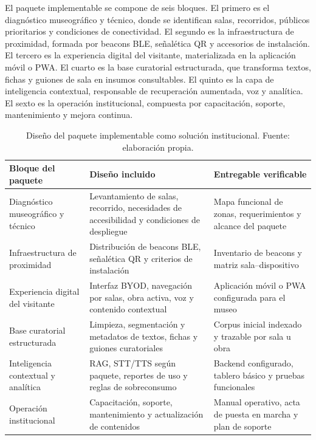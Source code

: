El paquete implementable se compone de seis bloques. El primero es el diagnóstico museográfico y técnico, donde se identifican salas, recorridos, públicos prioritarios y condiciones de conectividad. El segundo es la infraestructura de proximidad, formada por beacons BLE, señalética QR y accesorios de instalación. El tercero es la experiencia digital del visitante, materializada en la aplicación móvil o PWA. El cuarto es la base curatorial estructurada, que transforma textos, fichas y guiones de sala en insumos consultables. El quinto es la capa de inteligencia contextual, responsable de recuperación aumentada, voz y analítica. El sexto es la operación institucional, compuesta por capacitación, soporte, mantenimiento y mejora continua.

\begin{table}[h!]
    \centering
    \footnotesize
    \setlength{\tabcolsep}{4pt}
    \begin{tabular}{>{\raggedright\arraybackslash}p{4.0cm} >{\raggedright\arraybackslash}p{5.1cm} >{\raggedright\arraybackslash}p{5.1cm}}
        \hline
        \textbf{Bloque del paquete} & \textbf{Diseño incluido} & \textbf{Entregable verificable} \\
        \hline
        Diagnóstico museográfico y técnico & Levantamiento de salas, recorrido, necesidades de accesibilidad y condiciones de despliegue & Mapa funcional de zonas, requerimientos y alcance del paquete \\
        Infraestructura de proximidad & Distribución de beacons BLE, señalética QR y criterios de instalación & Inventario de beacons y matriz sala--dispositivo \\
        Experiencia digital del visitante & Interfaz BYOD, navegación por salas, obra activa, voz y contenido contextual & Aplicación móvil o PWA configurada para el museo \\
        Base curatorial estructurada & Limpieza, segmentación y metadatos de textos, fichas y guiones curatoriales & Corpus inicial indexado y trazable por sala u obra \\
        Inteligencia contextual y analítica & RAG, STT/TTS según paquete, reportes de uso y reglas de sobreconsumo & Backend configurado, tablero básico y pruebas funcionales \\
        Operación institucional & Capacitación, soporte, mantenimiento y actualización de contenidos & Manual operativo, acta de puesta en marcha y plan de soporte \\
        \hline
    \end{tabular}
    \caption[Diseño del paquete implementable]{Diseño del paquete implementable como solución institucional. Fuente: elaboración propia.}
    \label{tab:diseno-paquete-museiq}
\end{table}

